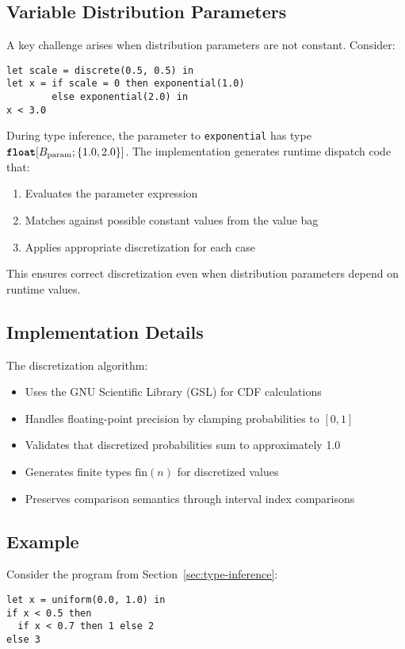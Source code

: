 \subsection{Variable Distribution Parameters}

A key challenge arises when distribution parameters are not constant. Consider:
\begin{lstlisting}
let scale = discrete(0.5, 0.5) in
let x = if scale = 0 then exponential(1.0) 
        else exponential(2.0) in
x < 3.0
\end{lstlisting}

During type inference, the parameter to \texttt{exponential} has type $\text{\ttfamily\bfseries float}[B_{\text{param}}; \{1.0, 2.0\}]$. The implementation generates runtime dispatch code that:
\begin{enumerate}
    \item Evaluates the parameter expression
    \item Matches against possible constant values from the value bag
    \item Applies appropriate discretization for each case
\end{enumerate}

This ensures correct discretization even when distribution parameters depend on runtime values.

\subsection{Implementation Details}

The discretization algorithm:
\begin{itemize}
    \item Uses the GNU Scientific Library (GSL) for CDF calculations
    \item Handles floating-point precision by clamping probabilities to $[0,1]$
    \item Validates that discretized probabilities sum to approximately 1.0
    \item Generates finite types $\text{fin}(n)$ for discretized values
    \item Preserves comparison semantics through interval index comparisons
\end{itemize}

\subsection{Example}

Consider the program from Section~\ref{sec:type-inference}:
\begin{lstlisting}
let x = uniform(0.0, 1.0) in
if x < 0.5 then 
  if x < 0.7 then 1 else 2
else 3
\end{lstlisting}

